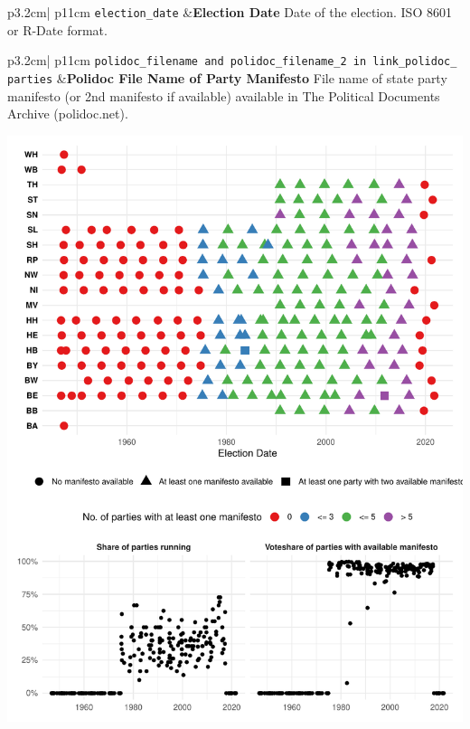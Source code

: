 \documentclass[
]{article}
\begin{document}
\begin{longtable}{p{3.2cm}| p{11cm}}
\texttt{election\_date} &\textbf{Election Date}\newline 
Date of the election.  ISO 8601 or R-Date format.
\end{longtable}

\begin{longtable}{p{3.2cm}| p{11cm}}
\texttt{polidoc\_filename and polidoc\_filename\_2 in link\_polidoc\_
parties} &\textbf{Polidoc File Name of Party Manifesto}\newline 
File name of state party manifesto (or 2nd manifesto if available) available in The Political Documents Archive (polidoc.net).


\hspace*{.25cm}
\begin{minipage}[t]{\linewidth }
\vspace{0pt}
\includegraphics[width = \linewidth]{cbpolidoc/pltpolidocparties.pdf}
\end{minipage}


\end{longtable}
\end{document}
